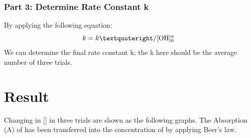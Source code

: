 \documentclass{article}
\begin{document}
\subsubsection{Part 3: Determine Rate Constant k}
By applying the following equation:
\begin{equation}
k = k’/[\ce{OH}]_{0}^a
\end{equation}
We can determine the final rate constant k; the k here should be the average number of three trials.

\section{Result}
Changing in [] in three trials are shown as the following graphs. The Absorption (A) of  has been transferred into the concentration of  by applying Beer’s law.
\end{document}
